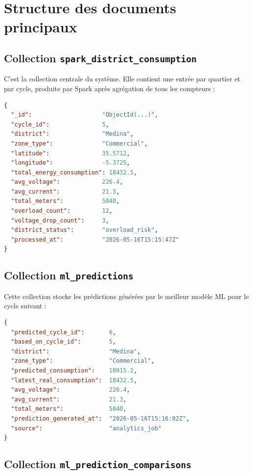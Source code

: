 \documentclass[1pt,a4paper]{report}
\begin{document}
\section{Structure des documents principaux}

\subsection{Collection \texttt{spark\_district\_consumption}}

C'est la collection centrale du système. Elle contient une entrée par quartier
et par cycle, produite par Spark après agrégation de tous les compteurs :

\begin{lstlisting}[language=json, caption={Document type — spark\_district\_consumption}]
{
  "_id":                    "ObjectId(...)",
  "cycle_id":               5,
  "district":               "Medina",
  "zone_type":              "Commercial",
  "latitude":               35.5712,
  "longitude":              -5.3725,
  "total_energy_consumption": 18432.5,
  "avg_voltage":            226.4,
  "avg_current":            21.3,
  "total_meters":           5040,
  "overload_count":         12,
  "voltage_drop_count":     3,
  "district_status":        "overload_risk",
  "processed_at":           "2026-05-16T15:15:47Z"
}
\end{lstlisting}

\subsection{Collection \texttt{ml\_predictions}}

Cette collection stocke les prédictions générées par le meilleur modèle ML
pour le cycle suivant :

\begin{lstlisting}[language=json, caption={Document type — ml\_predictions}]
{
  "predicted_cycle_id":       6,
  "based_on_cycle_id":        5,
  "district":                 "Medina",
  "zone_type":                "Commercial",
  "predicted_consumption":    18915.2,
  "latest_real_consumption":  18432.5,
  "avg_voltage":              226.4,
  "avg_current":              21.3,
  "total_meters":             5040,
  "prediction_generated_at":  "2026-05-16T15:16:02Z",
  "source":                   "analytics_job"
}
\end{lstlisting}

\subsection{Collection \texttt{ml\_prediction\_comparisons}}
\end{document}
